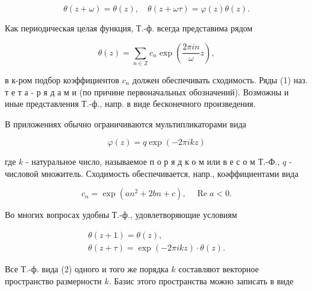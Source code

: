 \documentclass[10pt]{article}
\begin{document}
\[

\theta(z+\omega)=\theta(z), \quad \theta(z+\omega \tau)=\varphi(z) \theta(z) .

\]



Как периодическая целая функция, Т.-ф. всегда представима рядом



\[

\theta(z)=\sum_{n \in \mathbb{Z}} c_{n} \exp \left(\frac{2 \pi i n}{\omega} z\right),

\]



в к-ром подбор коэффициентов $c_{n}$ должен обеспечивать сходимость. Ряды (1) наз. т е т а - р я д а м и (по причине первоначальных обозначений). Возможны и иные представления Т.-ф., напр. в виде бесконечного произведения.



В приложениях обычно ограничиваются мультипликаторами вида



\[

\varphi(z)=q \exp (-2 \pi i k z)

\]



где $k$ - натуральное число, называемое п о р я д к о м или в е с о м Т.-Ф., $q$ - числовой множитель. Сходимость обеспечивается, напр., коәффициентами вида



\[

c_{n}=\exp \left(a n^{2}+2 b n+c\right), \quad \operatorname{Re} a<0 .

\]



Во многих вопросах удобны Т.-ф., удовлетворяющие условиям



\[

\begin{gathered}

\theta(z+1)=\theta(z), \\

\theta(z+\tau)=\exp (-2 \pi i k z) \cdot \theta(z) .

\end{gathered}

\]



Все Т.-ф. вида (2) одного и того же порядка $k$ составляют векторное пространство размерности $k$. Базис этого пространства можно записать в виде
\end{document}
